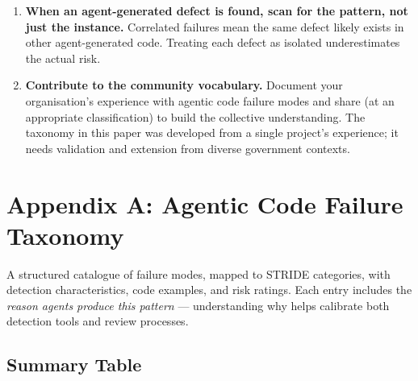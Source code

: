 \documentclass[a4paper,11pt]{report}
\begin{document}
\begin{enumerate}
  need but overlook the logical and analytical ones. These prompts are
  reviewable, version-controlled security artefacts that encode
  institutional knowledge in a form complementary to the
  machine-readable rules described in Section 7.2 and Appendix B. Run
  multiple prompted perspectives as a structured pre-screening step
  before human review to increase coverage breadth at agent speed
  (Section 7.1).
\item
  \textbf{When an agent-generated defect is found, scan for the pattern,
  not just the instance.} Correlated failures mean the same defect
  likely exists in other agent-generated code. Treating each defect as
  isolated underestimates the actual risk.
\item
  \textbf{Contribute to the community vocabulary.} Document your
  organisation's experience with agentic code failure modes and share
  (at an appropriate classification) to build the collective
  understanding. The taxonomy in this paper was developed from a single
  project's experience; it needs validation and extension from diverse
  government contexts.
\end{enumerate}

\hypertarget{appendix-a-agentic-code-failure-taxonomy}{%
\section{Appendix A: Agentic Code Failure
Taxonomy}\label{appendix-a-agentic-code-failure-taxonomy}}

A structured catalogue of failure modes, mapped to STRIDE categories,
with detection characteristics, code examples, and risk ratings. Each
entry includes the \emph{reason agents produce this pattern} ---
understanding why helps calibrate both detection tools and review
processes.

\hypertarget{summary-table}{%
\subsection{Summary Table}\label{summary-table}}
\end{document}
